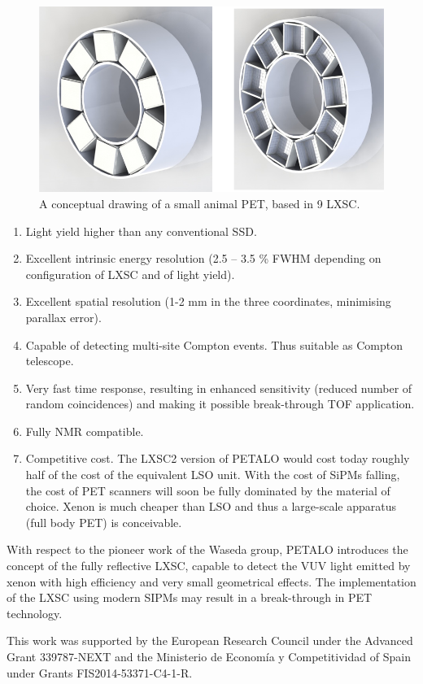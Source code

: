 \documentclass{JINST}
\begin{document}
\begin{figure}[!htb]
	\centering
	\includegraphics[scale=0.4]{img/SAP.png}
	\caption{\label{fig.smallPet} A conceptual drawing of a small animal PET, based in 9 LXSC. }
\end{figure}


\begin{enumerate}
\item Light yield higher than any conventional SSD.
\item Excellent intrinsic energy resolution (2.5 -- 3.5 \% FWHM depending on configuration of LXSC and of light yield). 
\item Excellent spatial resolution (1-2 mm in the three coordinates, minimising parallax error).
\item Capable of detecting multi-site Compton events. Thus suitable as Compton telescope.
\item Very fast time response, resulting in enhanced sensitivity (reduced number of random coincidences) and making it possible break-through TOF application. 
\item Fully NMR compatible. 
\item Competitive cost. The LXSC2 version of PETALO would cost today roughly half of the cost of the equivalent LSO unit. With the cost of SiPMs falling, the  cost of PET scanners will soon be fully dominated by the material of choice. Xenon is much cheaper than LSO and thus a large-scale apparatus (full body PET) is conceivable. 
\end{enumerate}

With respect to the pioneer work of the Waseda group, PETALO introduces the concept of the fully reflective LXSC, capable to detect the VUV light emitted by xenon with high efficiency and very small geometrical effects. The implementation of the LXSC using modern SIPMs may result in a break-through in PET technology. 


\acknowledgments

This work was supported by the European Research Council under the Advanced Grant 339787-NEXT and the Ministerio de Econom\'{i}a y Competitividad of Spain under Grants  FIS2014-53371-C4-1-R.


\end{document}
